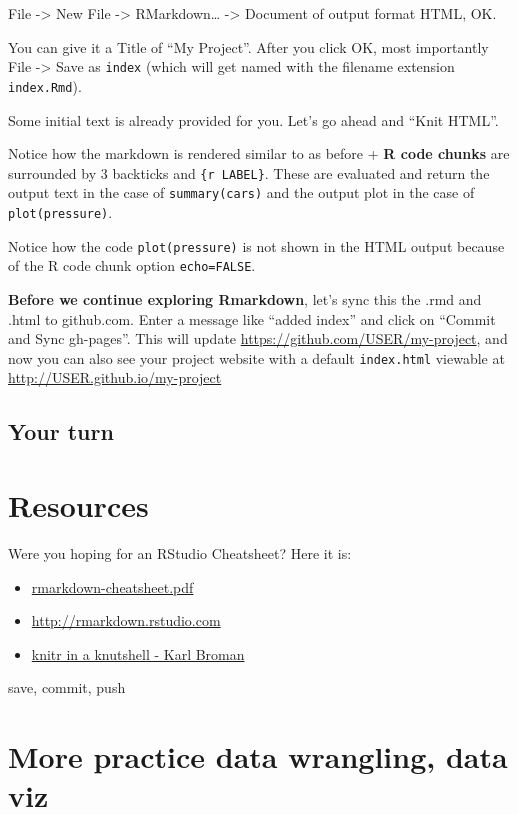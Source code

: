 \documentclass[]{book}
\providecommand{\tightlist}{%
  \setlength{\itemsep}{0pt}\setlength{\parskip}{0pt}}
\theoremstyle{definition}
\theoremstyle{definition}
\theoremstyle{definition}
\theoremstyle{remark}
\begin{document}
File -\textgreater{} New File -\textgreater{} RMarkdown\ldots{}
-\textgreater{} Document of output format HTML, OK.

You can give it a Title of ``My Project''. After you click OK, most
importantly File -\textgreater{} Save as \texttt{index} (which will get
named with the filename extension \texttt{index.Rmd}).

Some initial text is already provided for you. Let's go ahead and ``Knit
HTML''.

Notice how the markdown is rendered similar to as before + \textbf{R
code chunks} are surrounded by 3 backticks and \texttt{\{r\ LABEL\}}.
These are evaluated and return the output text in the case of
\texttt{summary(cars)} and the output plot in the case of
\texttt{plot(pressure)}.

Notice how the code \texttt{plot(pressure)} is not shown in the HTML
output because of the R code chunk option \texttt{echo=FALSE}.

\textbf{Before we continue exploring Rmarkdown}, let's sync this the
.rmd and .html to github.com. Enter a message like ``added index'' and
click on ``Commit and Sync gh-pages''. This will update
\url{https://github.com/USER/my-project}, and now you can also see your
project website with a default \texttt{index.html} viewable at
\url{http://USER.github.io/my-project}

\subsection{Your turn}\label{your-turn-12}

\section{Resources}\label{resources-2}

Were you hoping for an RStudio Cheatsheet? Here it is:

\begin{itemize}
\tightlist
\item
  \href{http://www.rstudio.com/wp-content/uploads/2016/03/rmarkdown-cheatsheet-2.0.pdf}{rmarkdown-cheatsheet.pdf}
\item
  \url{http://rmarkdown.rstudio.com}
\item
  \href{http://kbroman.org/knitr_knutshell/}{knitr in a knutshell - Karl
  Broman}
\end{itemize}

save, commit, push

\section{More practice data wrangling, data
viz}\label{more-practice-data-wrangling-data-viz}
\end{document}
